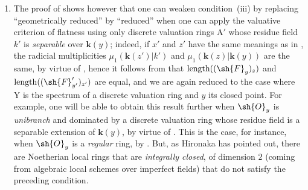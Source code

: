 \begin{remarks}[15.2.4]
\begin{enumerate}[label=(\roman*)]
To construct the rings $\mathrm{A}$ and $\mathrm{A}'$, let us start from an imperfect field $k$ of characteristic $p>0$; let $\mathrm{K}_0=k((\mathrm{T}))$ be the field of formal power series over $k$, $\mathrm{A}_0$ the valuation ring corresponding to the discrete valuation of $\mathrm{K}_0$; the residue field of $\mathrm{A}_0$ is thus $k$.
Let $\alpha$ be an element of $k$ that is not a $p$-th power, and let us take $k'=k(\alpha^{1/p})$; $\mathrm{K}=k'((\mathrm{T}))$ is then a finite radicial extension of $\mathrm{K}_0$, and $\mathrm{A}'=\mathrm{A}_0\otimes_k k'$ is the discrete valuation ring for $\mathrm{K}$.
If $\mathfrak{m}'$ is the maximal ideal of $\mathrm{A}'$, one will satisfy conditions~$1)$ and $2)$ by taking $\mathrm{A}=\mathrm{A}_0+\mathfrak{m}'$: indeed, as $\mathrm{A}_0$ is Noetherian and $\mathrm{A}'$ an $\mathrm{A}_0$-module of finite type, $\mathrm{A}$ is a $\mathrm{A}_0$-algebra finite, hence a Noetherian ring; $\mathrm{A}'$ is finite over $\mathrm{A}$, $\mathfrak{m}'$ is the only maximal ideal of $\mathrm{A}$, which is thus a complete local ring, evidently of dimension $1$ (being finite over $\mathrm{A}_0$) and geometrically unibranch since $\mathrm{A}'$ is integrally closed and having the same field of fractions $\mathrm{K}$ as $\mathrm{A}$.
  \item The proof of  shows however that one can weaken condition~(iii) by replacing ``geometrically reduced'' by ``reduced'' when one can apply the valuative criterion of flatness  using only discrete valuation rings $\mathrm{A}'$ whose residue field $k'$ is \emph{separable} over $\mathbf{k}(y)$; indeed, if $x'$ and $z'$ have the same meanings as in , the radicial multiplicities $\mu_1(\mathbf{k}(z')|k')$ and $\mu_1(\mathbf{k}(z)|\mathbf{k}(y))$ are the same, by virtue of , hence it follows from  that $\operatorname{length}((\sh{F}_y)_z)$ and $\operatorname{length}((\sh{F}_{y'}')_{z'})$ are equal, and we are again reduced to the case where $\mathrm{Y}$ is the spectrum of a discrete valuation ring and $y$ its closed point.
For example, one will be able to obtain this result further when $\sh{O}_y$ is \emph{unibranch} and dominated by a discrete valuation ring whose residue field is a separable extension of $\mathbf{k}(y)$, by virtue of .
This is the case, for instance, when $\sh{O}_y$ is a \emph{regular} ring, by .
But, as Hironaka has pointed out, there are Noetherian local rings that are \emph{integrally closed}, of dimension $2$ (coming from algebraic local schemes over imperfect fields) that do not satisfy the preceding condition.
\end{enumerate}
\end{remarks}

